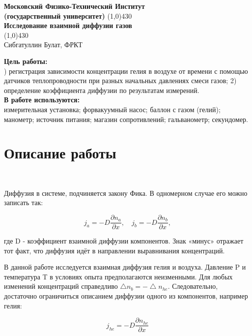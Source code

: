 \documentclass[11pt]{article}
\begin{document}
\begin{titlepage}

\begin{center}
\large\textbf{Московский Физико-Технический Институт}\\
\large\textbf{(государственный университет)}
\vfill
\line(1,0){430}\\[1mm]
\huge\textbf{Исследование взаимной диффузии газов}\\
\line(1,0){430}\\[1mm]
\vfill
\large Сибгатуллин Булат, ФРКТ\\
\end{center}

\end{titlepage}

\noindent \textbf{Цель работы:} \\
)  регистрация  зависимости  концентрации   гелия в воздухе от времени с помощью датчиков теплопроводности при разных начальных давлениях смеси газов; 2) определение коэффициента диффузии по результатам измерений.\\
\noindent \textbf{В работе используются:} \\
\indent измерительная установка; форвакуумный насос; баллон с газом (гелий); манометр; источник питания; магазин сопротивлений; гальванометр; секундомер.

\section*{Описание работы}\

Диффузия в системе, подчиняется закону Фика. В одномерном случае его можно записать так:

\[j_a = -D \frac{\partial n_a}{\partial x}, \quad j_b = -D \frac{\partial n_b}{\partial x},\]

где D - коэффициент взаимной диффузии  компонентов. Знак «минус» отражает тот факт, что диффузия идёт в направлении выравнивания концентраций.

В данной работе исследуется взаимная диффузия гелия и воздуха. Давление P и температура T в условиях опыта предполагаются неизменными.  Для любых изменений концентраций справедливо $\bigtriangleup n_b = -\bigtriangleup n_{he}$. Следовательно, достаточно ограничиться описанием диффузии одного из компонентов, например гелия:

\begin{equation}
j_{he} = -D \frac{\partial n_{he}}{\partial x}
\end{equation}
\end{document}
